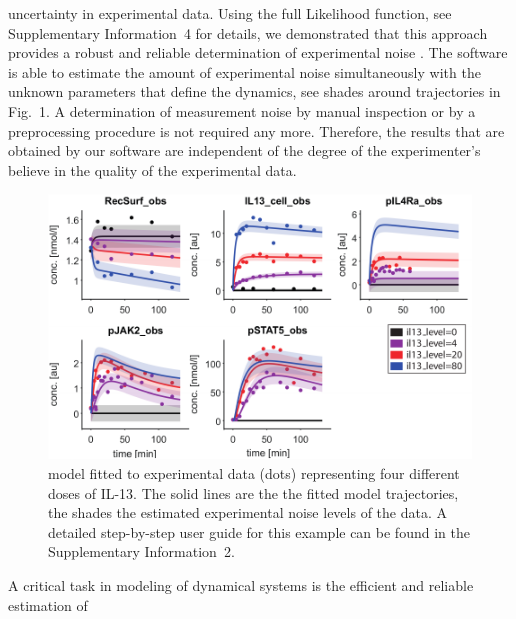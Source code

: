 \documentclass{bioinfo}
\begin{document}
uncertainty in experimental data. Using the full Likelihood function, see Supplementary 
Information~4 for details, we demonstrated that this approach provides a robust and reliable 
determination of experimental noise \citep{Raue:2012zt}. The software is able to estimate the 
amount of experimental noise simultaneously with the unknown parameters that define the 
dynamics, see shades around trajectories in Fig.~1. A determination of measurement noise by 
manual inspection or by a preprocessing procedure is not required any more. Therefore, the 
results that are obtained by our software are independent of the degree of the experimenter's 
believe in the quality of the experimental data.
\begin{figure}[!tpb]%
\centerline{\includegraphics[width=\linewidth]{Figure_D2D_AppNote_v2a.pdf}}
\caption{\citet{Raia:2011vn} model fitted to experimental data (dots) representing four different 
doses of IL-13. The solid lines are the the fitted model trajectories, the shades the estimated 
experimental noise levels of the data. A detailed step-by-step user guide for this example can 
be found in the Supplementary Information~2.}\label{fig:01}
\end{figure}
A critical task in modeling of dynamical systems is the efficient and reliable estimation of 
\end{document}
